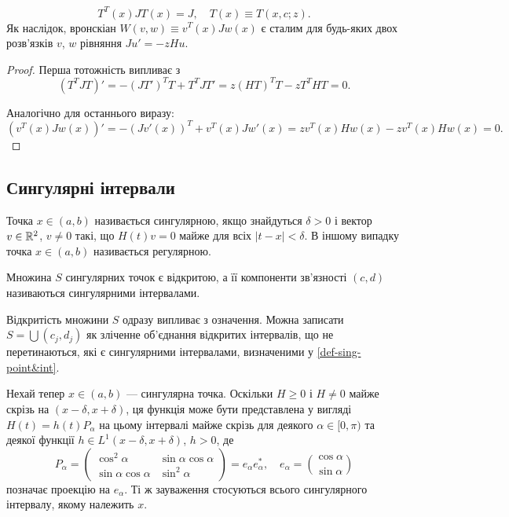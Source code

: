 \begin{theorem}
	\begin{equation*}
		T^T(x)JT(x)=J,\quad T(x)\equiv T(x,c;z).
	\end{equation*}
	Як наслідок, вронскіан $W(v,w)\equiv v^T(x)Jw(x)$ є сталим для будь-яких двох розв'язків $v$, $w$ рівняння $Ju'=-zHu$.
\end{theorem}
\begin{proof}
	Перша тотожність випливає з
	\begin{equation*}
		(T^{T}JT)'=-(JT')^{T}T+T^{T}JT'=z(HT)^{T}T-zT^{T}HT=0.
	\end{equation*}

	Аналогічно для останнього виразу:
	\begin{equation*}
		(v^T(x)Jw(x))'= -(Jv'(x))^T + v^T(x)Jw'(x) = zv^T(x)Hw(x) - zv^T(x)Hw(x) = 0.
	\end{equation*}
\end{proof}

\subsection{Сингулярні інтервали}

\begin{definition}\label{def-sing-point&int}
	Точка $x\in(a,b)$ називається сингулярною, якщо знайдуться $\delta>0$ і вектор $v\in\mathbb{R}^2$, $v\ne0$ такі, що $H(t)v=0$ майже для всіх $|t-x|<\delta$. В іншому випадку точка $x\in(a,b)$ називається регулярною.

	Множина $S$ сингулярних точок є відкритою, а її компоненти зв'язності $(c,d)$ називаються сингулярними інтервалами. 
\end{definition}

Відкритість множини $S$ одразу випливає з означення. Можна записати $S=\bigcup(c_j,d_j)$ як зліченне об'єднання відкритих інтервалів, що не перетинаються, які є сингулярними інтервалами, визначеними у \ref{def-sing-point&int}.

Нехай тепер $x\in(a,b)$ --- сингулярна точка. Оскільки $H\ge0$ і $H\ne0$ майже скрізь на $(x-\delta,x+\delta)$, ця функція може бути представлена у вигляді $H(t)=h(t)P_\alpha$ на цьому інтервалі майже скрізь для деякого $\alpha\in[0,\pi)$ та деякої функції $h\in L^1(x-\delta,x+\delta)$, $h>0$, де
\begin{equation}\label{eq-si-1}
	P_\alpha = 
	\begin{pmatrix}
		\cos^2{\alpha} & \sin{\alpha}\cos{\alpha} \\
		\sin{\alpha}\cos{\alpha} & \sin^2{\alpha}
	\end{pmatrix}
	= e_\alpha e^*_\alpha, \quad e_\alpha = \binom{\cos{\alpha}}{\sin{\alpha}}
\end{equation}
позначає проекцію на $e_\alpha$. Ті ж зауваження стосуються всього сингулярного інтервалу, якому належить $x$. 

